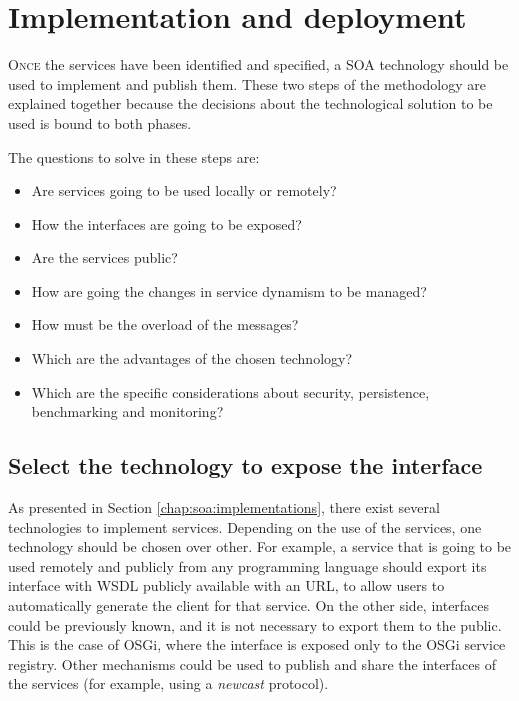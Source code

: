 


\section{Implementation and deployment}
\label{subsec:soaea:implementation}
\lettrine{O}{nce} the services have been identified and specified, a SOA technology should be used to implement and publish them. These two steps of the methodology are explained together because the decisions about the technological solution to be used is bound to both phases.

The questions to solve in these steps are:
\begin{itemize}
\item Are services going to be used locally or remotely?
\item How the interfaces are going to be exposed?
\item Are the services public?
\item How are going the changes in service dynamism to be managed?
\item How must be the overload of the messages? 
\item Which are the advantages of the chosen technology?
\item Which are the specific considerations about security, persistence, benchmarking and monitoring?
\end{itemize} 

\subsection{Select the technology to expose the interface}
As presented in Section \ref{chap:soa:implementations}, there exist several technologies to implement services. Depending on the use of the services, one technology should be chosen over other. For example, a service that is going to be used remotely and publicly from any programming language should export its interface with WSDL publicly available with an URL, to allow users to automatically generate the client for that service. On the other side, interfaces could be previously known, and it is not necessary to export them to the public. This is the case of OSGi, where the interface is exposed only to the OSGi service registry. Other mechanisms could be used to publish and share the interfaces of the services (for example, using a {\em newcast} protocol).

